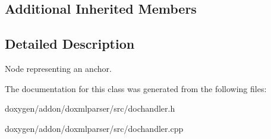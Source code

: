 \subsection*{Additional Inherited Members}


\subsection{Detailed Description}
Node representing an anchor. 



The documentation for this class was generated from the following files\+:\begin{DoxyCompactItemize}
\item 
doxygen/addon/doxmlparser/src/dochandler.\+h\item 
doxygen/addon/doxmlparser/src/dochandler.\+cpp\end{DoxyCompactItemize}
